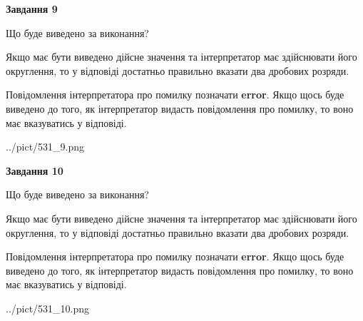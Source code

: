 \documentclass[12pt, ukrainian]{article}
\begin{document}
{\begin {Large}
{\begin {center}\textbf{Завдання 9}\end {center}}\par
Що буде виведено за виконання? \par

Якщо має бути виведено дійсне значення та інтерпретатор має здійснювати його округлення, 
то у відповіді достатньо правильно вказати два дробових розряди.

Повідомлення інтерпретатора про помилку позначати \textbf{error}.
Якщо щось буде виведено до того, як інтерпретатор видасть повідомлення про помилку, 
то воно має вказуватись у відповіді. \par

\begin{center}
	{../pict/531_9.png}
\end{center}
\newpage

{\begin {center}\textbf{Завдання 10}\end {center}}\par
Що буде виведено за виконання? \par

Якщо має бути виведено дійсне значення та інтерпретатор має здійснювати його округлення, 
то у відповіді достатньо правильно вказати два дробових розряди.

Повідомлення інтерпретатора про помилку позначати \textbf{error}.
Якщо щось буде виведено до того, як інтерпретатор видасть повідомлення про помилку, 
то воно має вказуватись у відповіді. \par

\begin{center}
	{../pict/531_10.png}
\end{center}
\newpage

\end {Large}}
\end{document}
